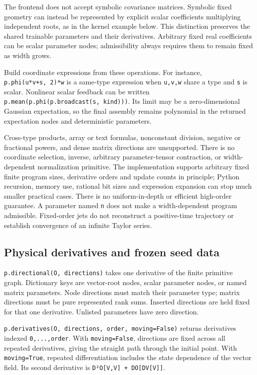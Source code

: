 \documentclass[
  11pt,
]{article}
\theoremstyle{definition}
\theoremstyle{plain}
\theoremstyle{plain}
\theoremstyle{plain}
\theoremstyle{remark}
\begin{document}
The frontend does not accept symbolic covariance matrices. Symbolic
fixed geometry can instead be represented by explicit scalar
coefficients multiplying independent roots, as in the kernel example
below. This distinction preserves the shared trainable parameters and
their derivatives. Arbitrary fixed real coefficients can be scalar
parameter nodes; admissibility always requires them to remain fixed as
width grows.

Build coordinate expressions from these operations. For instance,
\texttt{p.phi(u*v+s,\ 2)*w} is a same-type expression when
\texttt{u,v,w} share a type and \texttt{s} is scalar. Nonlinear scalar
feedback can be written \texttt{p.mean(p.phi(p.broadcast(s,\ kind)))}.
Its limit may be a zero-dimensional Gaussian expectation, so the final
assembly remains polynomial in the returned expectation nodes and
deterministic parameters.

Cross-type products, array or text formulas, nonconstant division,
negative or fractional powers, and dense matrix directions are
unsupported. There is no coordinate selection, inverse, arbitrary
parameter-tensor contraction, or width-dependent normalization
primitive. The implementation supports arbitrary fixed finite program
sizes, derivative orders and update counts in principle; Python
recursion, memory use, rational bit sizes and expression expansion can
stop much smaller practical cases. There is no uniform-in-depth or
efficient high-order guarantee. A parameter named \texttt{n} does not
make a width-dependent program admissible. Fixed-order jets do not
reconstruct a positive-time trajectory or establish convergence of an
infinite Taylor series.

\subsection{Physical derivatives and frozen seed
data}\label{physical-derivatives-and-frozen-seed-data}

\texttt{p.directional(O,\ directions)} takes one derivative of the
finite primitive graph. Dictionary keys are vector-root nodes, scalar
parameter nodes, or named matrix parameters. Node directions must match
their parameter type; matrix directions must be pure represented rank
sums. Inserted directions are held fixed for that one derivative.
Unlisted parameters have zero direction.

\texttt{p.derivatives(O,\ directions,\ order,\ moving=False)} returns
derivatives indexed \texttt{0,...,order}. With \texttt{moving=False},
directions are fixed across all repeated derivatives, giving the
straight path through the initial point. With \texttt{moving=True},
repeated differentiation includes the state dependence of the vector
field. Its second derivative is
\texttt{D²O{[}V,V{]}\ +\ DO{[}DV{[}V{]}{]}}.
\end{document}
